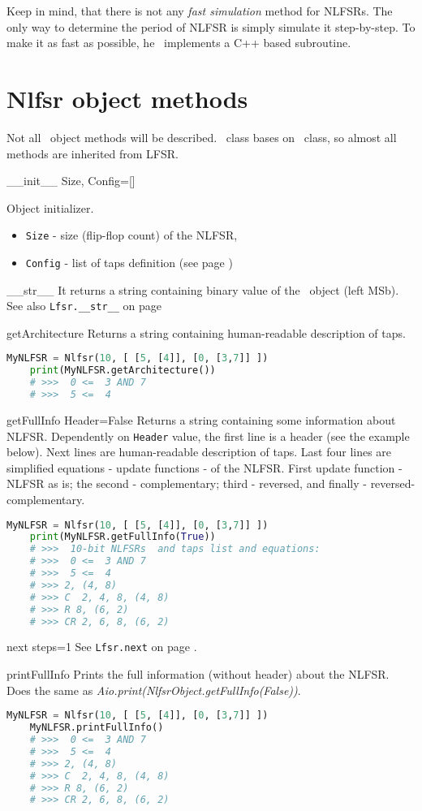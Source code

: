 Keep in mind, that there is not any \textit{fast simulation} method for NLFSRs. The only way to determine the period of NLFSR is simply simulate it step-by-step. To make it as fast as possible, he \ShellName\ implements a C++ based subroutine.

\section{Nlfsr object methods}

Not all \Nlfsr\ object methods will be described. \Nlfsr\ class bases on \Lfsr\ class, so almost all methods are inherited from LFSR.

 {\_\_init\_\_} {Size, Config=[]} {
	Object initializer.
	\begin{itemize}
		\item \texttt{Size} - size (flip-flop count) of the NLFSR,
		\item \texttt{Config} - list of taps definition (see page \pageref{nlfsr:taps})
	\end{itemize}
}

 {\_\_str\_\_} {} {
	It returns a string containing binary value of the \Nlfsr\ object (left MSb). See also \texttt{Lfsr.\_\_str\_\_} on page \pageref{lfsr:str}
}

 {getArchitecture} {} {
	Returns a string containing human-readable description of taps.
}
\begin{lstlisting}[language=Python]
	MyNLFSR = Nlfsr(10, [ [5, [4]], [0, [3,7]] ])
	print(MyNLFSR.getArchitecture())
	# >>>  0 <=  3 AND 7
	# >>>  5 <=  4
\end{lstlisting}

 {getFullInfo} {Header=False} {
	Returns a string containing some information about NLFSR. Dependently on \texttt{Header} value, the first line is a header (see the example below). Next lines are human-readable description of taps. Last four lines are simplified equations - update functions - of the NLFSR. First update function - NLFSR as is; the second - complementary; third - reversed, and finally - reversed-complementary.
}
\begin{lstlisting}[language=Python]
	MyNLFSR = Nlfsr(10, [ [5, [4]], [0, [3,7]] ])
	print(MyNLFSR.getFullInfo(True))
	# >>>  10-bit NLFSRs  and taps list and equations:
	# >>>  0 <=  3 AND 7
	# >>>  5 <=  4
	# >>> 2, (4, 8)
	# >>> C  2, 4, 8, (4, 8)
	# >>> R 8, (6, 2)
	# >>> CR 2, 6, 8, (6, 2)
\end{lstlisting}

 {next} {steps=1} {
	See \texttt{Lfsr.next} on page \pageref{lfsr:next}.
}

 {printFullInfo} {} {
	Prints the full information (without header) about the NLFSR. Does the same as \textit{Aio.print(NlfsrObject.getFullInfo(False))}.
}
\begin{lstlisting}[language=Python]
	MyNLFSR = Nlfsr(10, [ [5, [4]], [0, [3,7]] ])
	MyNLFSR.printFullInfo()
	# >>>  0 <=  3 AND 7
	# >>>  5 <=  4
	# >>> 2, (4, 8)
	# >>> C  2, 4, 8, (4, 8)
	# >>> R 8, (6, 2)
	# >>> CR 2, 6, 8, (6, 2)
\end{lstlisting}
